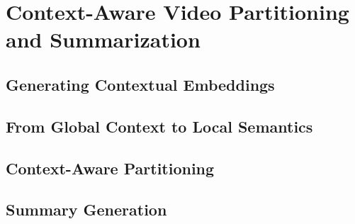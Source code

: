 \section{Context-Aware Video Partitioning and Summarization}
\label{section:method-model}

    \subsection{Generating Contextual Embeddings}
        
    \subsection{From Global Context to Local Semantics}
        

    \subsection{Context-Aware Partitioning}

    \subsection{Summary Generation}